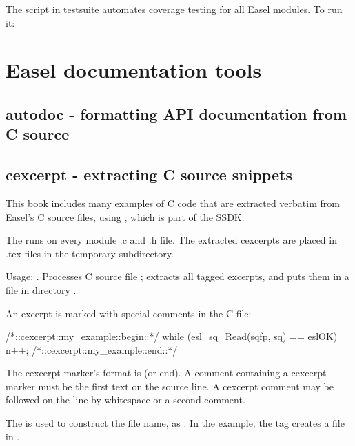 The  script in testsuite automates coverage
testing for all Easel modules. To run it:

\begin{cchunk} 
\end{cchunk}


\section{Easel documentation tools}

\subsection{autodoc - formatting API documentation from C source}


\subsection{cexcerpt - extracting C source snippets}

This book includes many examples of C code that are extracted verbatim
from Easel's C source files, using , which is part of
the SSDK.

The  runs  on every
module .c and .h file. The extracted cexcerpts are placed in .tex
files in the temporary  subdirectory.

Usage: . Processes C source file
; extracts all tagged excerpts, and puts them in a file
in directory .

An excerpt is marked with special comments in the C file:
\begin{cchunk}
/*::cexcerpt::my_example::begin::*/
   while (esl_sq_Read(sqfp, sq) == eslOK)
     { n++; }
/*::cexcerpt::my_example::end::*/
\end{cchunk}

The cexcerpt marker's format is  (or
end). A comment containing a cexcerpt marker must be the first text on
the source line. A cexcerpt comment may be followed on the line by
whitespace or a second comment.

The  is used to construct the file name, as
.  In the example, the tag  creates
a file  in .

